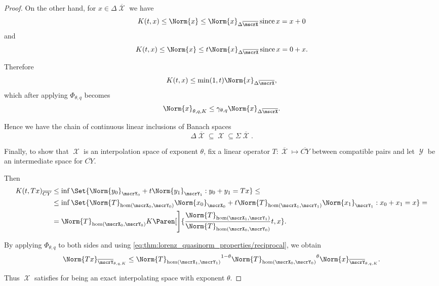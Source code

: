 \begin{proof}
  On the other hand, for \( x \in \Delta \overline{\mscrX} \) we have
  \begin{equation*}
    K(t, x) \leq \Norm{x} \leq \Norm{x}_{\Delta \overline{\mscrX}} \T{since} x = x + 0
  \end{equation*}
  and
  \begin{equation*}
    K(t, x) \leq \Norm{x} \leq t \Norm{x}_{\Delta \overline{\mscrX}} \T{since} x = 0 + x.
  \end{equation*}

  Therefore
  \begin{equation*}
    K(t, x) \leq \min(1, t) \Norm{x}_{\Delta \overline{\mscrX}},
  \end{equation*}
  which after applying \( \Phi_{\theta,q} \) becomes
  \begin{equation*}
    \Norm{x}_{\theta,q,K} \leq \gamma_{\theta,q} \Norm{x}_{\Delta \overline{\mscrX}}.
  \end{equation*}

  Hence we have the chain of continuous linear inclusions of Banach spaces
  \begin{equation*}
    \Delta \overline{\mscrX} \subseteq \mscrX \subseteq \Sigma \overline{\mscrX}.
  \end{equation*}

  Finally, to show that \( \mscrX \) is an interpolation space of exponent \( \theta \), fix a linear operator \( T: \overline{\mscrX} \mapsto \overline{CY} \) between compatible pairs and let \( \mscrY \) be an intermediate space for \( \overline{CY} \).

  Then
  \begin{align*}
    K(t, Tx)_{\overline{CY}}
    &\leq
    \inf \Set{ \Norm{y_0}_{\mscrY_0} + t \Norm{y_1}_{\mscrY_1} : y_0 + y_1 = Tx }
    \leq \\ &\leq
    \inf \Set{ \Norm{T}_{\hom(\mscrX_0, \mscrY_0)} \Norm{x_0}_{\mscrX_0} + t \Norm{T}_{\hom(\mscrX_1, \mscrY_1)} \Norm{x_1}_{\mscrY_1} : x_0 + x_1 = x }
    = \\ &=
    \Norm{T}_{\hom(\mscrX_0, \mscrY_0)} K\Paren[\Bigg]{\frac {\Norm{T}_{\hom(\mscrX_1, \mscrY_1)}} {\Norm{T}_{\hom(\mscrX_0, \mscrY_0)}} t, x}.
  \end{align*}

  By applying \( \Phi_{\theta,q} \) to both sides and using \eqref{eq:thm:lorenz_quasinorm_properties/reciprocal}, we obtain
  \begin{equation*}
    \Norm{Tx}_{\overline{\mscrY}_{\theta,q,K}}
    \leq
    {\Norm{T}_{\hom(\mscrX_1, \mscrY_1)}}^{1 - \theta} {\Norm{T}_{\hom(\mscrX_0, \mscrY_0)}}^{\theta} \Norm{x}_{\overline{\mscrY}_{\theta,q,K}}.
  \end{equation*}

  Thus \( \mscrX \) satisfies  for being an exact interpolating space with exponent \( \theta \).
\end{proof}

